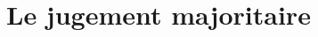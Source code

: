 \documentclass[conference]{IEEEtran}
\begin{document}



\section{Le jugement majoritaire}
\label{sec:mj}
\end{document}
